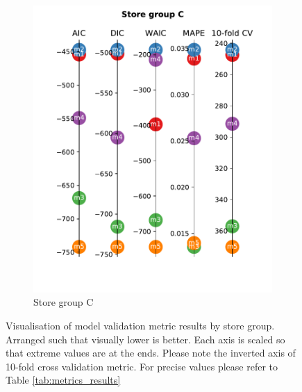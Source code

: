 \documentclass[english, 12pt, a4paper, sci, utf8, a-1b, online]{aaltothesis}
\begin{document}
\begin{abstractpage}[english]
\begin{figure}
	\begin{subfigure}[htb]{0.5\textwidth}
		\centering
		\includegraphics[width=\textwidth]{../plots/metrics/metrics_plot_C.pdf}
		\caption{Store group C}
		\label{fig:metrics_C}
	\end{subfigure}
	\caption{\label{fig:metrics_visualization}Visualisation of model validation metric results by store group. Arranged such that visually lower is better.
	Each axis is scaled so that extreme values are at the ends. Please note the inverted axis of 10-fold cross validation metric. For 
	precise values please refer to Table \ref{tab:metrics_results}}
\end{figure}


\end{abstractpage}
\end{document}
